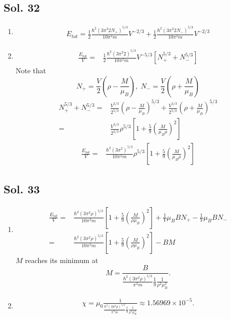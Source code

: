    \subsection*{Sol. 32}
   \begin{enumerate}
       \item 
       \begin{align*}
       E_{tot}=\frac{1}{2}\frac{\hbar^2(3\pi^2 2N_+)^{5/3}}{10\pi^2m}V^{-2/3}
       +
       \frac{1}{2}\frac{\hbar^2(3\pi^2 2N_-)^{5/3}}{10\pi^2m}V^{-2/3}
   \end{align*}
   \item 
   \begin{align*}
       \frac{E_{tot}}{V}
       =&
       \frac{1}{2}\frac{\hbar^2(3\pi^2 2)^{5/3}}{10\pi^2m}
       V^{-5/3}
       \left[
       N_+^{5/3}
       +
       N_-^{5/3}
       \right]
   \end{align*}
   Note that 
   $$
   N_+=\frac{V}{2}\left(\rho-\frac{M}{\mu_B}\right),\; 
   N_-=\frac{V}{2}\left(\rho+\frac{M}{\mu_B}\right)
   $$
   \begin{align*}
       N_+^{5/3} + N_-^{5/3}
       =&\frac{V^{5/3}}{2^{5/3}}\left(\rho-\frac{M}{\mu_B}\right)^{5/3}
       +\frac{V^{5/3}}{2^{5/3}}\left(\rho+\frac{M}{\mu_B}\right)^{5/3}\\
       =&\frac{V^{5/3}}{2^{2/3}}\rho^{5/3}
       \left[1+\frac{5}{9}
       \left(\frac{M}{\mu_B\rho}\right)^2\right]
   \end{align*}
   \begin{align*}
       \frac{E_{tot}}{V}=&
       \frac{\hbar^2(3\pi^2 )^{5/3}}{10\pi^2m}\rho^{5/3}
       \left[1+\frac{5}{9}
       \left(\frac{M}{\mu_B\rho}\right)^2\right]
   \end{align*}
   \end{enumerate}
   \subsection*{Sol. 33}
   \begin{enumerate}
       \item 
       \begin{align*}
           \frac{E_{tot}}{V} =& \frac{\hbar^2(3\pi^2\rho)^{5/3}}{10\pi^2m}
           \left[
           1+\frac{5}{9}\left( \frac{M}{\rho\mu_B}\right)^2
           \right]
           +\frac{1}{V}\mu_BBN_+ - \frac{1}{V}\mu_B BN_-\\
           =&
           \frac{\hbar^2(3\pi^2\rho)^{5/3}}{10\pi^2m}
           \left[
           1+\frac{5}{9}\left( \frac{M}{\rho\mu_B}\right)^2
           \right]
           -BM
       \end{align*}
       $M$ reaches its minimum at 
       $$
       M=\frac{B}
       {\frac{\hbar^2(3\pi^2\rho)^{5/3}}{\pi^2m} \frac{1}{9}\frac{1}{\rho^2\mu_B^2}}.
       $$
       \item 
       \begin{align*}
           \chi = \mu_0
           \frac{1}
       {\frac{\hbar^2(3\pi^2\rho)^{5/3}}{\pi^2m} \frac{1}{9}\frac{1}{\rho^2\mu_B^2}}
       \approx 1.56969\times 10^{-5}.
       \end{align*}
   \end{enumerate}
